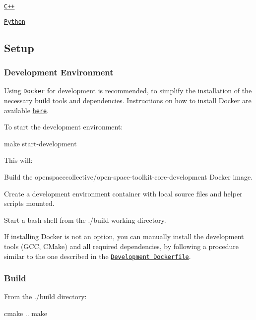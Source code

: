 \begin{DoxyItemize}
\item \href{./tutorials/cpp}{\tt C++}
\item \href{./tutorials/python}{\tt Python}
\end{DoxyItemize}

\subsection*{Setup}

\subsubsection*{Development Environment}

Using \href{https://www.docker.com}{\tt Docker} for development is recommended, to simplify the installation of the necessary build tools and dependencies. Instructions on how to install Docker are available \href{https://docs.docker.com/install/}{\tt here}.

To start the development environment\+:


\begin{DoxyCode}
make start-development
\end{DoxyCode}


This will\+:


\begin{DoxyEnumerate}
\item Build the {\ttfamily openspacecollective/open-\/space-\/toolkit-\/core-\/development} Docker image.
\item Create a development environment container with local source files and helper scripts mounted.
\item Start a {\ttfamily bash} shell from the {\ttfamily ./build} working directory.
\end{DoxyEnumerate}

If installing Docker is not an option, you can manually install the development tools (G\+CC, C\+Make) and all required dependencies, by following a procedure similar to the one described in the \href{./docker/development/Dockerfile}{\tt Development Dockerfile}.

\subsubsection*{Build}

From the {\ttfamily ./build} directory\+:


\begin{DoxyCode}
cmake ..
make
\end{DoxyCode}


